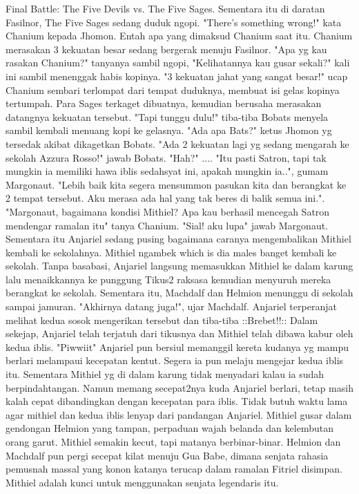 \documentclass[a4paper,11pt,final]{article}
\begin{document}
Final Battle: The Five Devils vs. The Five Sages.
Sementara itu di daratan Fasilnor, The Five Sages sedang duduk ngopi.
"There's something wrong!" kata Chanium kepada Jhomon. Entah apa yang dimaksud Chanium saat itu.
Chanium merasakan 3 kekuatan besar sedang bergerak menuju Fasilnor.
"Apa yg kau rasakan Chanium?" tanyanya sambil ngopi, "Kelihatannya kau gusar sekali?" kali ini sambil menenggak habis kopinya.
"3 kekuatan jahat yang sangat besar!" ucap Chanium sembari terlompat dari tempat duduknya, membuat isi gelas kopinya tertumpah. Para Sages terkaget dibuatnya, kemudian berusaha merasakan datangnya kekuatan tersebut.
"Tapi tunggu dulu!" tiba-tiba Bobats menyela sambil kembali menuang kopi ke gelasnya. "Ada apa Bats?" ketus Jhomon yg tersedak akibat dikagetkan Bobats. "Ada 2 kekuatan lagi yg sedang mengarah ke sekolah Azzura Rosso!" jawab Bobats. "Hah?" ....
"Itu pasti Satron, tapi tak mungkin ia memiliki hawa iblis sedahsyat ini, apakah mungkin ia..", gumam Margonaut. "Lebih baik kita segera mensummon pasukan kita dan berangkat ke 2 tempat tersebut. Aku merasa ada hal yang tak beres di balik semua ini.".
"Margonaut, bagaimana kondisi Mithiel? Apa kau berhasil mencegah Satron mendengar ramalan itu" tanya Chanium. "Sial! aku lupa" jawab Margonaut. Sementara itu Anjariel sedang pusing bagaimana caranya mengembalikan Mithiel kembali ke sekolahnya.
Mithiel ngambek which is dia males banget kembali ke sekolah.
Tanpa basabasi, Anjariel langsung memasukkan Mithiel ke dalam karung lalu menaikkannya ke punggung Tikus2 raksasa kemudian menyuruh mereka berangkat ke sekolah. Sementara itu, Machdalf dan Helmion menunggu di sekolah sampai jamuran.
"Akhirnya datang juga!", ujar Machdalf. Anjariel terperanjat melihat kedua sosok mengerikan tersebut dan tiba-tiba ::Brebet!!:: Dalam sekejap, Anjariel telah terjatuh dari tikusnya dan Mithiel telah dibawa kabur oleh kedua iblis.
"Piwwiit" Anjariel pun bersiul memanggil kereta kudanya yg mampu berlari melampaui kecepatan kentut. Segera ia pun melaju mengejar kedua iblis itu. Sementara Mithiel yg di dalam karung tidak menyadari kalau ia sudah berpindahtangan.
Namun memang secepat2nya kuda Anjariel berlari, tetap masih kalah cepat dibandingkan dengan kecepatan para iblis. Tidak butuh waktu lama agar mithiel dan kedua iblis lenyap dari pandangan Anjariel.
Mithiel gusar dalam gendongan Helmion yang tampan, perpaduan wajah belanda dan kelembutan orang garut. Mithiel semakin kecut, tapi matanya berbinar-binar.
Helmion dan Machdalf pun pergi secepat kilat menuju Gua Babe, dimana senjata rahasia pemusnah massal yang konon katanya terucap dalam ramalan Fitriel disimpan. Mithiel adalah kunci untuk menggunakan senjata legendaris itu.
\end{document}
